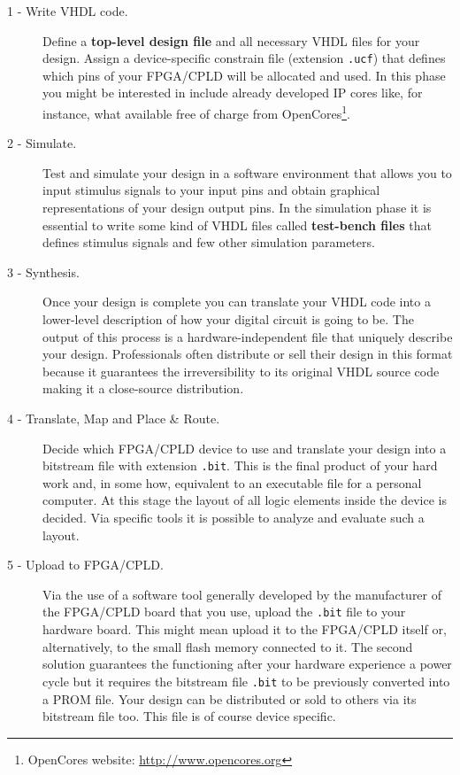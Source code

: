 \documentclass[13pt]{extreport}
\begin{document}
\begin{description}
\item[1 - Write VHDL code.] Define a \textbf{top-level design file} and all necessary VHDL files for your design. Assign a device-specific constrain file (extension \texttt{.ucf}) that defines which pins of your FPGA/CPLD will be allocated and used. In this phase you might be interested in include already developed IP cores like, for instance, what available free of charge from OpenCores\footnote{OpenCores website: \scriptsize\url{http://www.opencores.org}}.

\item[2 - Simulate.] Test and simulate your design in a software environment that allows you to input stimulus signals to your input pins and obtain graphical representations of your design output pins. In the simulation phase it is essential to write some kind of VHDL files called \textbf{test-bench files} that defines stimulus signals and few other simulation parameters.

\item [3 - Synthesis.] Once your design is complete you can translate your VHDL code into a lower-level description of how your digital circuit is going to be. The output of this process is a hardware-independent file that uniquely describe your design. Professionals often distribute or sell their design in this format because it guarantees the irreversibility to its original VHDL source code making it a close-source distribution.

\item [4 - Translate, Map and Place \& Route.] Decide which FPGA/CPLD device to use and translate your design into a bitstream file with extension \texttt{.bit}. This is the final product of your hard work and, in some how, equivalent to an executable file for a personal computer. At this stage the layout of all logic elements inside the device is decided. Via specific tools it is possible to analyze and evaluate such a layout.

\item [5 - Upload to FPGA/CPLD.] Via the use of a software tool generally developed by the manufacturer of the FPGA/CPLD board that you use, upload the \texttt{.bit} file to your hardware board. This might mean upload it to the FPGA/CPLD itself or, alternatively, to the small flash memory connected to it. The second solution guarantees the functioning after your hardware experience a power cycle but it requires the bitstream file \texttt{.bit} to be previously converted into a PROM file. Your design can be distributed or sold to others via its bitstream file too. This file is of course device specific.
\end{description}
\end{document}
